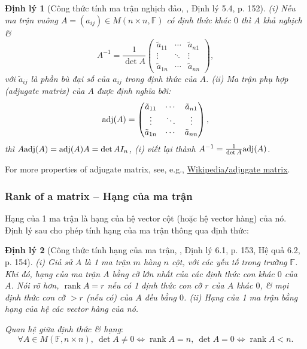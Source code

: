\documentclass{article}
\newtheorem{dinhly}{Định lý}
\begin{document}
\begin{dinhly}[Công thức tính ma trận nghịch đảo, \cite{Hung_linear_algebra}, Định lý 5.4, p. 152]
	(i) Nếu ma trận vuông $A = (a_{ij})\in M(n\times n,\mathbb{F})$ có định thức khác $0$ thì $A$ khả nghịch \&
	\begin{equation*}
		A^{-1} = \frac{1}{\det A}\begin{pmatrix}
			\tilde{a}_{11} & \cdots & \tilde{a}_{n1}\\\vdots & \ddots & \vdots\\\tilde{a}_{1n} & \cdots & \tilde{a}_{nn}
		\end{pmatrix},
	\end{equation*}
	với $\tilde{a}_{ij}$ là phần bù đại số của $a_{ij}$ trong định thức của $A$. (ii) {\rm Ma trận phụ hợp} (adjugate matrix) của $A$ được định nghĩa bởi:
	\begin{equation*}
		{\rm adj}(A) = \begin{pmatrix}
			\tilde{a}_{11} & \cdots & \tilde{a}_{n1}\\\vdots & \ddots & \vdots\\\tilde{a}_{1n} & \cdots & \tilde{a}_{nn}
		\end{pmatrix},
	\end{equation*}
	thì $A{\rm adj}(A) = {\rm adj}(A)A = \det A I_n$, (i) viết lại thành $A^{-1} = \frac{1}{\det A}{\rm adj}(A)$.
\end{dinhly}
For more properties of adjugate matrix, see, e.g., \href{https://en.wikipedia.org/wiki/Adjugate_matrix}{Wikipedia{\tt/}adjugate matrix}.


\subsubsection{Rank of a matrix -- Hạng của ma trận}
Hạng của 1 ma trận là hạng của hệ vector cột (hoặc hệ vector hàng) của nó. Định lý sau cho phép tính hạng của ma trận thông qua định thức:

\begin{dinhly}[Công thức tính hạng của ma trận, \cite{Hung_linear_algebra}, Định lý 6.1, p. 153, Hệ quả 6.2, p. 154]
	(i) Giả sử $A$ là 1 ma trận $m$ hàng $n$ cột, với các yếu tố trong trường $\mathbb{F}$. Khi đó, hạng của ma trận $A$ bằng cỡ lớn nhất của các định thức con khác $0$ của $A$. Nói rõ hơn, $\operatorname{rank}A = r$ nếu có 1 định thức con cỡ $r$ của $A$ khác $0$, \& mọi định thức con cỡ $> r$ (nếu có) của $A$ đều bằng $0$. (ii) Hạng của 1 ma trận bằng hạng của hệ các vector hàng của nó.
\end{dinhly}
{\it Quan hệ giữa định thức \& hạng}:
\begin{equation*}
	\forall A\in M(\mathbb{F},n\times n),\ \det A\ne0\Leftrightarrow\operatorname{rank}A = n,\ \det A = 0\Leftrightarrow\operatorname{rank}A < n.
\end{equation*}
\end{document}
